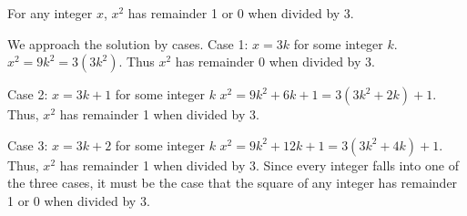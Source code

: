 \question For any integer $x$, $x^2$ has remainder 1 or 0 when 
divided by 3.

\begin{solution}[3in]
We approach the solution by cases. \newline
Case 1: $x = 3k$ for some integer $k$.\newline
$x^2 = 9k^2 = 3(3k^2)$. Thus $x^2$ has remainder 0 when 
divided by 3.\newline

Case 2: $x = 3k + 1$ for some integer $k$\newline
$x^2 = 9k^2 + 6k + 1 = 3(3k^2 + 2k) + 1$. Thus, $x^2$ has 
remainder 1 when divided by 3.\newline

Case 3: $x = 3k + 2$ for some integer $k$\newline
$x^2 = 9k^2 + 12k + 1 = 3(3k^2 + 4k) + 1$. Thus, $x^2$ has 
remainder 1 when divided by 3.\newline
Since every integer falls into one of the three cases, it must be 
the case that the square of any integer has remainder 1 or 0 when 
divided by 3.
\end{solution}
